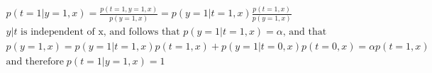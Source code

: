 %
%
	
\begin{answer}
\begin{align*}
p(t=1|y=1,x) = \frac{p(t=1,y=1,x)}{p(y=1,x)} = p(y=1|t=1,x) \frac{p(t=1,x)}{p(y=1,x)}\\
\text{$y|t$ is independent of x, and follows that $p(y=1|t=1,x)=\alpha$, and that}\\
p(y=1,x) = p(y=1|t=1,x)p(t=1,x) + p(y=1|t=0,x)p(t=0,x) = \alpha p(t=1,x)\\
\text{and therefore} \; p(t=1|y=1,x)=1
\end{align*}
\end{answer}
%